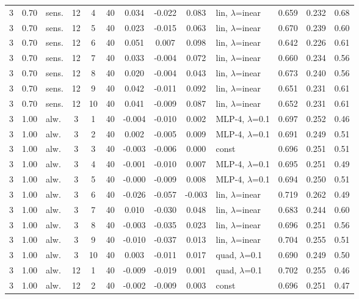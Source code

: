 \begin{scriptsize}
\begin{longtable}{cclcc c ccc l ccc}
3 & 0.70 & sens. & 12 & 4 & 40 & 0.034 & -0.022 & 0.083 & lin, $\lambda$=inear & 0.659 & 0.232 & 0.68 \\
3 & 0.70 & sens. & 12 & 5 & 40 & 0.023 & -0.015 & 0.063 & lin, $\lambda$=inear & 0.670 & 0.239 & 0.60 \\
3 & 0.70 & sens. & 12 & 6 & 40 & 0.051 & 0.007 & 0.098 & lin, $\lambda$=inear & 0.642 & 0.226 & 0.61 \\
3 & 0.70 & sens. & 12 & 7 & 40 & 0.033 & -0.004 & 0.072 & lin, $\lambda$=inear & 0.660 & 0.234 & 0.56 \\
3 & 0.70 & sens. & 12 & 8 & 40 & 0.020 & -0.004 & 0.043 & lin, $\lambda$=inear & 0.673 & 0.240 & 0.56 \\
3 & 0.70 & sens. & 12 & 9 & 40 & 0.042 & -0.011 & 0.092 & lin, $\lambda$=inear & 0.651 & 0.231 & 0.61 \\
3 & 0.70 & sens. & 12 & 10 & 40 & 0.041 & -0.009 & 0.087 & lin, $\lambda$=inear & 0.652 & 0.231 & 0.61 \\
3 & 1.00 & alw. & 3 & 1 & 40 & -0.004 & -0.010 & 0.002 & MLP-4, $\lambda$=0.1 & 0.697 & 0.252 & 0.46 \\
3 & 1.00 & alw. & 3 & 2 & 40 & 0.002 & -0.005 & 0.009 & MLP-4, $\lambda$=0.1 & 0.691 & 0.249 & 0.51 \\
3 & 1.00 & alw. & 3 & 3 & 40 & -0.003 & -0.006 & 0.000 & const & 0.696 & 0.251 & 0.51 \\
3 & 1.00 & alw. & 3 & 4 & 40 & -0.001 & -0.010 & 0.007 & MLP-4, $\lambda$=0.1 & 0.695 & 0.251 & 0.49 \\
3 & 1.00 & alw. & 3 & 5 & 40 & -0.000 & -0.009 & 0.008 & MLP-4, $\lambda$=0.1 & 0.694 & 0.250 & 0.51 \\
3 & 1.00 & alw. & 3 & 6 & 40 & -0.026 & -0.057 & -0.003 & lin, $\lambda$=inear & 0.719 & 0.262 & 0.49 \\
3 & 1.00 & alw. & 3 & 7 & 40 & 0.010 & -0.030 & 0.048 & lin, $\lambda$=inear & 0.683 & 0.244 & 0.60 \\
3 & 1.00 & alw. & 3 & 8 & 40 & -0.003 & -0.035 & 0.023 & lin, $\lambda$=inear & 0.696 & 0.251 & 0.56 \\
3 & 1.00 & alw. & 3 & 9 & 40 & -0.010 & -0.037 & 0.013 & lin, $\lambda$=inear & 0.704 & 0.255 & 0.51 \\
3 & 1.00 & alw. & 3 & 10 & 40 & 0.003 & -0.011 & 0.017 & quad, $\lambda$=0.1 & 0.690 & 0.249 & 0.50 \\
3 & 1.00 & alw. & 12 & 1 & 40 & -0.009 & -0.019 & 0.001 & quad, $\lambda$=0.1 & 0.702 & 0.255 & 0.46 \\
3 & 1.00 & alw. & 12 & 2 & 40 & -0.002 & -0.009 & 0.003 & const & 0.696 & 0.251 & 0.47 \\

\end{longtable}
\end{scriptsize}
